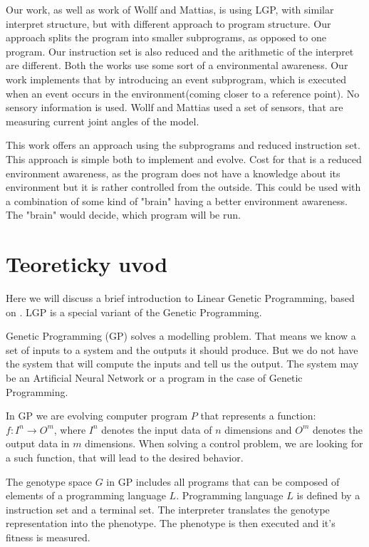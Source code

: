 \documentclass{ExcelAtFIT}
\begin{document}
Our work, as well as work of Wollf and Mattias, is using LGP, with similar interpret structure, but with different approach to program structure.
Our approach splits the program into smaller subprograms, as opposed to one program.
Our instruction set is also reduced and the arithmetic of the interpret are different.
Both the works use some sort of a environmental awareness.
Our work implements that by introducing an event subprogram, which is executed when an event occurs in the environment(coming closer to a reference point).
No sensory information is used.
Wollf and Mattias used a set of sensors, that are measuring current joint angles of the model.

This work offers an approach using the subprograms and reduced instruction set.
This approach is simple both to implement and evolve.
Cost for that is a reduced environment awareness, as the program does not have a knowledge about its environment but it is rather controlled from the outside.
This could be used with a combination of some kind of "brain" having a better environment awareness.
The "brain" would decide, which program will be run.


\section{Teoreticky uvod}
\label{sec:theory}
Here we will discuss a brief introduction to Linear Genetic Programming, based on \cite{Brameier2010}.
LGP is a special variant of the Genetic Programming.

Genetic Programming (GP) solves a modelling problem.
That means we know a set of inputs to a system and the outputs it should produce.
But we do not have the system that will compute the inputs and tell us the output.
The system may be an Artificial Neural Network or a program in the case of Genetic Programming.

In GP we are evolving computer program $P$ that represents a function: $f : I^n \to O^m$, where $I^n$ denotes the input data of $n$ dimensions and $O^m$ denotes the output data in $m$ dimensions.
When solving a control problem, we are looking for a such function, that will lead to the desired behavior.

The genotype space $G$ in GP includes all programs that can be composed of elements of a programming language $L$.
Programming language $L$ is defined by a instruction set and a terminal set.
The interpreter translates the genotype representation into the phenotype.
The phenotype is then executed and it's fitness is measured.
\end{document}
